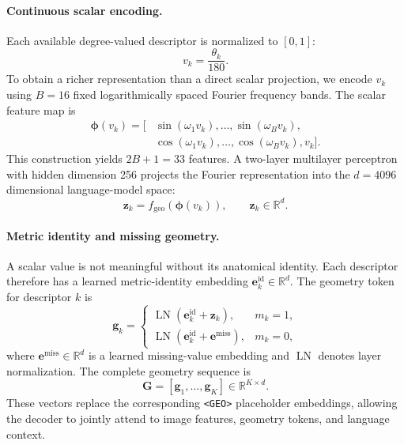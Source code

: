 \paragraph{Continuous scalar encoding.}
Each available degree-valued descriptor is normalized to $[0,1]$:
\begin{equation}
    v_k = \frac{\theta_k}{180}.
    \label{eq:angle_normalization}
\end{equation}
To obtain a richer representation than a direct scalar projection, we
encode $v_k$ using $B=16$ fixed logarithmically spaced Fourier frequency
bands. The scalar feature map is
\begin{equation}
\begin{split}
    \boldsymbol{\phi}(v_k)
    =
    \big[
        &\sin(\omega_1v_k),\ldots,\sin(\omega_Bv_k),\\
        &\cos(\omega_1v_k),\ldots,\cos(\omega_Bv_k),
        v_k
    \big].
\end{split}
\label{eq:fourier_features}
\end{equation}
This construction yields $2B+1=33$ features. A two-layer multilayer
perceptron with hidden dimension 256 projects the Fourier representation
into the $d=4096$ dimensional language-model space:
\begin{equation}
    \mathbf{z}_k
    =
    f_{\mathrm{geo}}
    \left(
        \boldsymbol{\phi}(v_k)
    \right),
    \qquad
    \mathbf{z}_k\in\mathbb{R}^{d}.
    \label{eq:scalar_projection}
\end{equation}

\paragraph{Metric identity and missing geometry.}
A scalar value is not meaningful without its anatomical identity. Each
descriptor therefore has a learned metric-identity embedding
$\mathbf{e}^{\mathrm{id}}_k\in\mathbb{R}^{d}$. The geometry token for
descriptor $k$ is
\begin{equation}
    \mathbf{g}_k =
    \begin{cases}
    \operatorname{LN}\!\left(
        \mathbf{e}^{\mathrm{id}}_k + \mathbf{z}_k
    \right), & m_k=1, \\[5pt]
    \operatorname{LN}\!\left(
        \mathbf{e}^{\mathrm{id}}_k +
        \mathbf{e}^{\mathrm{miss}}
    \right), & m_k=0,
    \end{cases}
    \label{eq:geometry_token}
\end{equation}
where $\mathbf{e}^{\mathrm{miss}}\in\mathbb{R}^{d}$ is a learned
missing-value embedding and $\operatorname{LN}$ denotes layer
normalization. The complete geometry sequence is
\begin{equation}
    \mathbf{G}
    =
    [\mathbf{g}_1,\ldots,\mathbf{g}_K]
    \in\mathbb{R}^{K\times d}.
    \label{eq:geometry_sequence}
\end{equation}
These vectors replace the corresponding \texttt{<GEO>} placeholder
embeddings, allowing the decoder to jointly attend to image features,
geometry tokens, and language context.

